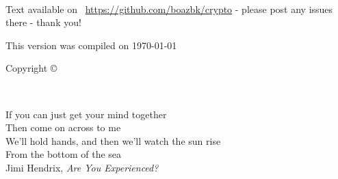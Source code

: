\frontmatter


\maketitle



\newpage
\begin{fullwidth}
~\vfill
\thispagestyle{empty}
\setlength{\parindent}{0pt}
\setlength{\parskip}{\baselineskip}

Text available on \faGithub\  \url{https://github.com/boazbk/crypto} - please post any issues there - thank you!

This version was compiled on \today\ \currenttime

Copyright \copyright\ \the\year\ \thanklessauthor

\doclicenseThis



\end{fullwidth}



\cleardoublepage
\thispagestyle{empty}%
~\vfill
\begin{doublespace}
\nohyphenation
\noindent If you can just get your mind together \\
\noindent  Then come on across to me \\
\noindent We'll hold hands, and then we'll watch the sun rise \\
\noindent  From the bottom of the sea \\

Jimi Hendrix, \emph{Are You Experienced?}
\end{doublespace}
\vfill
\vfill








\cleardoublepage

\setcounter{tocdepth}{1}
\setcounter{secnumdepth}{3}


\cleardoublepage
\setcounter{tocdepth}{3}
\tableofcontents


\cleardoublepage

